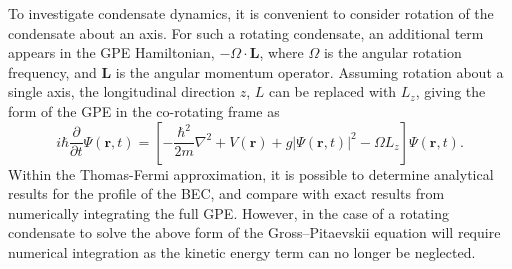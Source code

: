 To investigate condensate dynamics, it is convenient to consider rotation of the condensate about an axis. For such a rotating condensate, an additional term appears in the GPE Hamiltonian, $-\Omega\cdot \mathbf{L}$, where $\Omega$ is the angular rotation frequency, and $\mathbf{L}$ is the angular momentum operator. Assuming rotation about a single axis, the longitudinal direction $z$, $L$ can be replaced with $L_z$, giving the form of the GPE in the co-rotating frame as
\begin{equation}\label{eqn:gpe_rotation}
i\hbar\frac{\partial}{\partial t}\Psi(\mathbf{r},t) = \left[-\frac{\hbar^2}{2m}\nabla^2 + V(\mathbf{r}) + g\vert\Psi(\textbf{r},t)\vert^2 - \Omega L_z  \right]\Psi(\mathbf{r},t).
\end{equation}
Within the Thomas-Fermi approximation, it is possible to determine analytical results for the profile of the BEC, and compare with exact results from numerically integrating the full GPE. However, in the case of a rotating condensate to solve the above form of the Gross--Pitaevskii equation will require numerical integration as the kinetic energy term can no longer be neglected.

